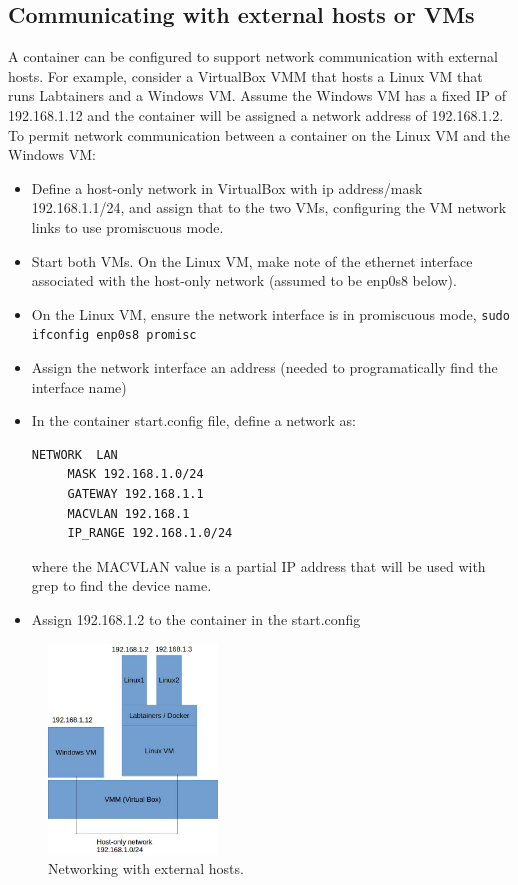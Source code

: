 \documentclass[12pt]{article}
\begin{document}
\subsection{Communicating with external hosts or VMs}
\label {external hosts}
A container can be configured to support network communication with external hosts.
For example, consider a VirtualBox VMM that hosts a Linux VM that runs Labtainers and
a Windows VM.  Assume the Windows VM has a fixed IP of 192.168.1.12 and the container 
will be assigned a network address of 192.168.1.2.  To permit network communication between 
a container on the Linux VM and the Windows VM:
\begin{itemize}
\item Define a host-only network in VirtualBox with ip address/mask 192.168.1.1/24, and assign that to the two VMs, configuring the VM
network links to use promiscuous mode.
\item Start both VMs.  On the Linux VM, make note of the ethernet interface associated with the host-only network (assumed to be enp0s8 below).
\item On the Linux VM, ensure the network interface is in promiscuous mode, {\tt sudo ifconfig enp0s8 promisc}
\item Assign the network interface an address (needed to programatically find the interface name)
\item In the container start.config file, define a network as:
\begin{verbatim}
NETWORK  LAN
     MASK 192.168.1.0/24
     GATEWAY 192.168.1.1
     MACVLAN 192.168.1
     IP_RANGE 192.168.1.0/24
\end{verbatim}
\noindent where the MACVLAN value is a partial IP address that will be used with grep to find the device name.
\item Assign 192.168.1.2 to the container in the start.config
\end{itemize}

\begin{figure}[ht]
\centering
\includegraphics[width=0.4\textwidth,natwidth=621,natheight=403]{ExternalNetworks.jpg}
\caption{Networking with external hosts.}
\label{fig:external hosts}
\end{figure}
\end{document}
